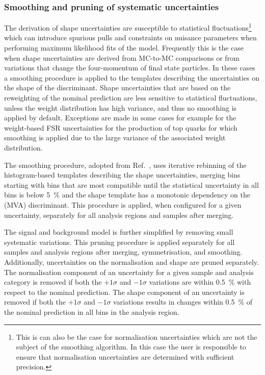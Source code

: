 \subsubsection{Smoothing and pruning of systematic uncertainties}

The derivation of shape uncertainties are susceptible to statistical
fluctuations\footnote{This is can also be the case for normalisation
  uncertainties which are not the subject of the smoothing
  algorithm. In this case the user is responsible to ensure that
  normalisation uncertainties are determined with sufficient
  precision.} which can introduce spurious pulls and constraints on
nuisance parameters when performing maximum likelihood fits of the
model. Frequently this is the case when shape uncertainties are
derived from MC-to-MC comparisons or from variations that change the
four-momentum of final state particles. In these cases a smoothing
procedure is applied to the templates describing the uncertainties on
the shape of the discriminant. Shape uncertainties that are based on
the reweighting of the nominal prediction are less sensitive to
statistical fluctuations, unless the weight distribution has high
variance, and thus no smoothing is applied by default. Exceptions are
made in some cases for example for the weight-based FSR uncertainties
for the production of top quarks for which smoothing is applied due to
the large variance of the associated weight distribution.

The smoothing procedure, adopted from Ref.~\cite{HIGG-2013-23}, uses
iterative rebinning of the histogram-based templates describing the
shape uncertainties, merging bins starting with bins that are most
compatible until the statistical uncertainty in all bins is below
\SI{5}{\percent} and the shape template has a monotonic
dependency on the (MVA) discriminant. This procedure is
applied, when configured for a given uncertainty, separately for all
analysis regions and samples after merging.

The signal and background model is further simplified by removing
small systematic variations. This pruning procedure is applied
separately for all samples and analysis regions after merging,
symmetrisation, and smoothing. Additionally, uncertainties on the
normalisation and shape are pruned separately. The normalisation
component of an uncertainty for a given sample and analysis category
is removed if both the $+1\sigma$ and $-1\sigma$ variations are within
\SI{0.5}{\percent} with respect to the nominal prediction. The shape
component of an uncertainty is removed if both the $+1\sigma$ and
$-1\sigma$ variations results in changes within \SI{0.5}{\percent} of
the nominal prediction in all bins in the analysis region.


